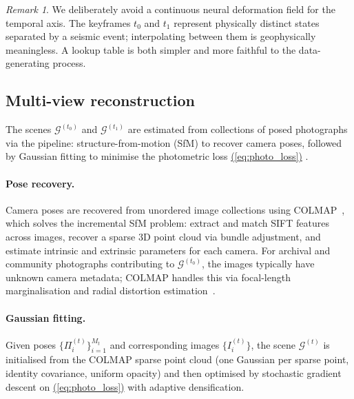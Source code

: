 \documentclass[11pt,a4paper]{article}
\renewcommand{\eqref}[1]{%
    \hyperref[#1]{\textcolor{eqred}{(\ref*{#1})}}%
}
\theoremstyle{plain}
\theoremstyle{definition}
\theoremstyle{remark}
\newtheorem{remark}[theorem]{Remark}
\newcommand{\GS}{\mathcal{G}}
\begin{document}
\begin{remark}
We deliberately avoid a continuous neural deformation field for the
temporal axis. The keyframes $t_0$ and $t_1$ represent physically
distinct states separated by a seismic event; interpolating between
them is geophysically meaningless. A lookup table is both simpler and
more faithful to the data-generating process.
\end{remark}

\subsection{Multi-view reconstruction}
\label{sec:layer1_reconstruction}

The scenes $\GS^{(t_0)}$ and $\GS^{(t_1)}$ are estimated from
collections of posed photographs via the pipeline: structure-from-motion
(SfM) to recover camera poses, followed by Gaussian fitting to
minimise the photometric loss \eqref{eq:photo_loss}.

\paragraph{Pose recovery.}
Camera poses are recovered from unordered image collections using
COLMAP~\cite{schonberger2016structure}, which solves the incremental SfM
problem: extract and match SIFT features across images, recover a sparse
3D point cloud via bundle adjustment, and estimate intrinsic and
extrinsic parameters for each camera. For archival and community
photographs contributing to $\GS^{(t_0)}$, the images typically have
unknown camera metadata; COLMAP handles this via focal-length
marginalisation and radial distortion estimation~\cite{snavely2006photo}.

\paragraph{Gaussian fitting.}
Given poses $\{\Pi_i^{(t)}\}_{i=1}^{M_t}$ and corresponding images
$\{I_i^{(t)}\}$, the scene $\GS^{(t)}$ is initialised from the COLMAP
sparse point cloud (one Gaussian per sparse point, identity covariance,
uniform opacity) and then optimised by stochastic gradient descent on
\eqref{eq:photo_loss} with adaptive densification.
\end{document}
